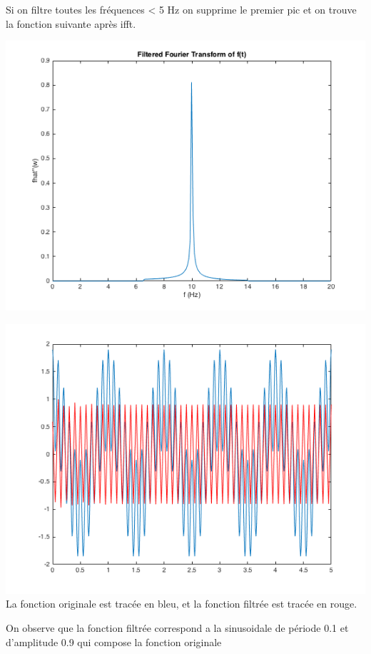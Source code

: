 \documentclass[a4paper,11pt]{article}
\begin{document}
Si on filtre toutes les fréquences < 5 Hz on supprime le premier pic et on trouve la fonction suivante après ifft. \newline
\begin{center}
\includegraphics[scale=0.6]{"fhathigh.png"} \newline
\end{center}
\begin{center}
\includegraphics[scale=0.6]{"f_and_fhathigh.png"} \newline
La fonction originale est tracée en bleu, et la fonction filtrée est tracée en rouge.
\end{center}
On observe que la fonction filtrée correspond a la sinusoidale de période 0.1 et d'amplitude 0.9 qui compose la fonction originale \newline
\end{document}
